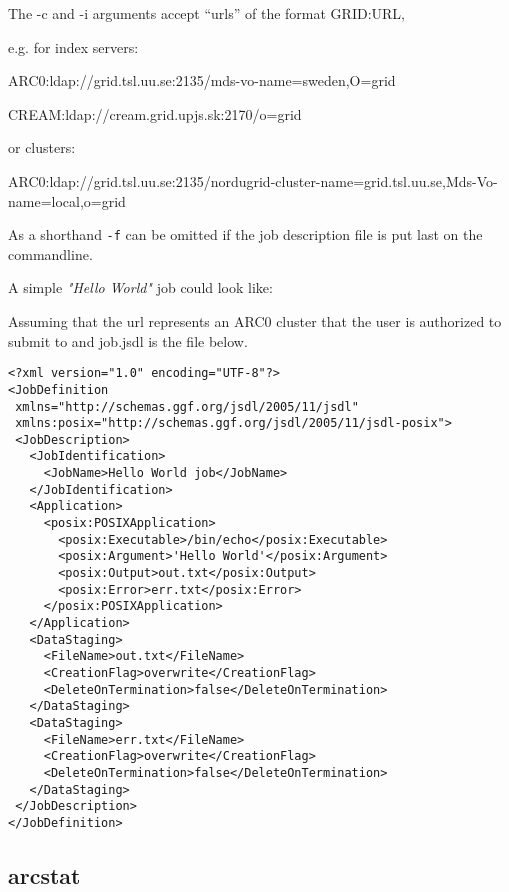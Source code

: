 \begin{framed}
The -c and -i arguments accept ``urls'' of the format GRID:URL,

e.g. for index servers:

ARC0:ldap://grid.tsl.uu.se:2135/mds-vo-name=sweden,O=grid

CREAM:ldap://cream.grid.upjs.sk:2170/o=grid

or clusters:

ARC0:ldap://grid.tsl.uu.se:2135/nordugrid-cluster-name=grid.tsl.uu.se,Mds-Vo-name=local,o=grid
\end{framed}

As a shorthand \texttt{-f} can be omitted if the job description file is put last on the commandline.

A simple \textit{"Hello World"} job could look like:

\begin{shaded}
\end{shaded}

Assuming that the url represents an ARC0 cluster that the user is authorized to submit to and job.jsdl is the file below.

\begin{framed}
\begin{verbatim}
<?xml version="1.0" encoding="UTF-8"?>
<JobDefinition
 xmlns="http://schemas.ggf.org/jsdl/2005/11/jsdl"
 xmlns:posix="http://schemas.ggf.org/jsdl/2005/11/jsdl-posix">
 <JobDescription>
   <JobIdentification>
     <JobName>Hello World job</JobName>
   </JobIdentification>
   <Application>
     <posix:POSIXApplication>
       <posix:Executable>/bin/echo</posix:Executable>
       <posix:Argument>'Hello World'</posix:Argument>
       <posix:Output>out.txt</posix:Output>
       <posix:Error>err.txt</posix:Error>
     </posix:POSIXApplication>
   </Application>
   <DataStaging>
     <FileName>out.txt</FileName>
     <CreationFlag>overwrite</CreationFlag>
     <DeleteOnTermination>false</DeleteOnTermination>
   </DataStaging>
   <DataStaging>
     <FileName>err.txt</FileName>
     <CreationFlag>overwrite</CreationFlag>
     <DeleteOnTermination>false</DeleteOnTermination>
   </DataStaging>
 </JobDescription>
</JobDefinition>
\end{verbatim}
\end{framed}

\subsection{arcstat}
\label{sec:arcstat}


